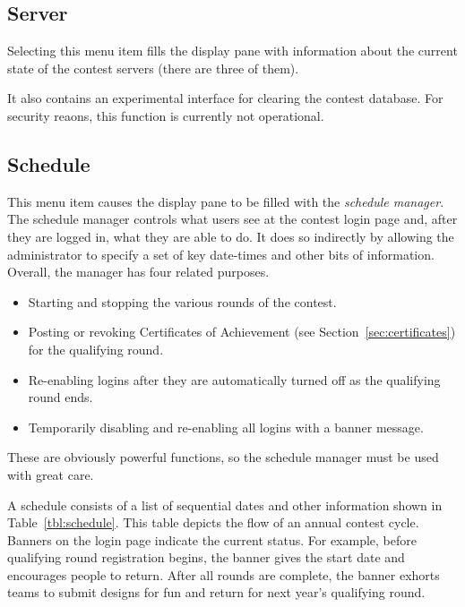 \documentclass[11pt,letterpaper]{refart}
\begin{document}
\subsection{Server}
Selecting this menu item fills the display pane with information about the
current state of the contest servers (there are three of them).  

It also contains an experimental interface
for clearing the contest database.  For security reaons, this function is currently
not operational.

\subsection{Schedule}
This menu item causes the display pane to be filled with the \emph{schedule
manager}. The schedule manager controls what users see at the contest
login page and, after they are logged in, what they are able to do. 
It does so indirectly by allowing the administrator to specify a set of key 
date-times and other bits of information.
Overall, the manager has four related purposes.
\begin{itemize}
\item Starting and stopping the various rounds of the contest.
\item Posting or revoking Certificates of Achievement (see Section~\ref{sec:certificates}) 
  for the qualifying round.
\item Re-enabling logins after they are automatically turned off
as the qualifying round ends.
\item Temporarily disabling and re-enabling all logins with a banner 
message.
\end{itemize}
These are obviously powerful functions, so the schedule manager must
be used with great care.

A schedule consists of a list of sequential dates and other information
shown in Table~\ref{tbl:schedule}. This table depicts the flow of an
annual contest cycle. Banners on the login page indicate the current
status. For example, before qualifying round registration begins, the
banner gives the start date and encourages people to return. After
all rounds are complete, the banner exhorts teams to submit designs
for fun and return for next year's qualifying round.
\end{document}
